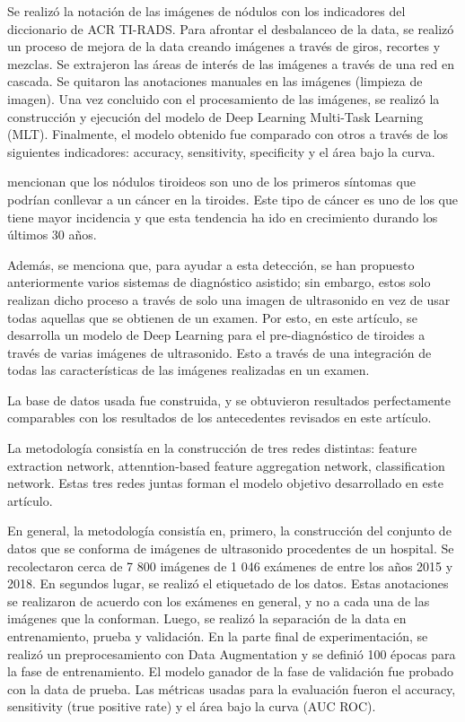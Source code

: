 Se realizó la notación de las imágenes de nódulos con los indicadores del diccionario de ACR TI-RADS. Para afrontar el desbalanceo de la data, se realizó un proceso de mejora de la data creando imágenes a través de giros, recortes y mezclas. Se extrajeron las áreas de interés de las imágenes a través de una red en cascada. Se quitaron las anotaciones manuales en las imágenes (limpieza de imagen). Una vez concluido con el procesamiento de las imágenes, se realizó la construcción y ejecución del modelo de Deep Learning Multi-Task Learning (MLT). Finalmente, el modelo obtenido fue comparado con otros a través de los siguientes indicadores: accuracy, sensitivity, specificity y el área bajo la curva. 

\cite{pr_wang2020autodiag} mencionan que los nódulos tiroideos son uno de los primeros síntomas que podrían conllevar a un cáncer en la tiroides. Este tipo de cáncer es uno de los que tiene mayor incidencia y que esta tendencia ha ido en crecimiento durando los últimos 30 años.

Además, se menciona que, para ayudar a esta detección, se han propuesto anteriormente varios sistemas de diagnóstico asistido; sin embargo, estos solo realizan dicho proceso a través de solo una imagen de ultrasonido en vez de usar todas aquellas que se obtienen de un examen. Por esto, en este artículo, se desarrolla un modelo de Deep Learning para el pre-diagnóstico de tiroides a través de varias imágenes de ultrasonido. Esto a través de una integración de todas las características de las imágenes realizadas en un examen. 

La base de datos usada fue construida, y se obtuvieron resultados perfectamente comparables con los resultados de los antecedentes revisados en este artículo.

La metodología consistía en la construcción de tres redes distintas: feature extraction network, attenntion-based feature aggregation network, classification network. Estas tres redes juntas forman el modelo objetivo desarrollado en este artículo.

En general, la metodología consistía en, primero, la construcción del conjunto de datos que se conforma de imágenes de ultrasonido procedentes de un hospital. Se recolectaron cerca de 7 800 imágenes de 1 046 exámenes de entre los años 2015 y 2018. En segundos lugar, se realizó el etiquetado de los datos. Estas anotaciones se realizaron de acuerdo con los exámenes en general, y no a cada una de las imágenes que la conforman. Luego, se realizó la separación de la data en entrenamiento, prueba y validación. En la parte final de experimentación, se realizó un preprocesamiento con Data Augmentation y se definió 100 épocas para la fase de entrenamiento. El modelo ganador de la fase de validación fue probado con la data de prueba. Las métricas usadas para la evaluación fueron el accuracy, sensitivity (true positive rate) y el área bajo la curva (AUC ROC).

